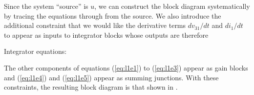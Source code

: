 \ifslidesonly
\begin{slide}\label{opteq:l1e1a}

\end{slide}
\fi


Since the system ``source'' is $u$, we can construct the block diagram
systematically by tracing the equations through from the source. We
also introduce the additional constraint that we would like the derivative terms
$dv_{31}/dt$ and $di_1/dt$ to
appear as inputs to integrator blocks whose outputs are therefore
\ifslidesonly
\begin{slide}\label{opteq:l1e1b}
Integrator equations:

\end{slide}
\fi
The other
components of equations (\ref{eq:l1e1}) to (\ref{eq:l1e3}) appear as
gain blocks and (\ref{eq:l1e4}) and (\ref{eq:l1e5}) appear as summing
junctions.  With these constraints, the resulting block diagram is
that shown in .

